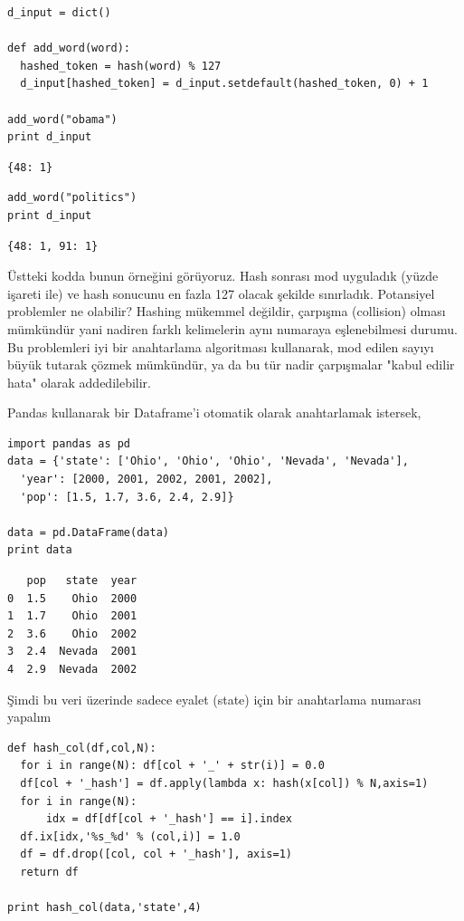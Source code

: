 \documentclass[12pt,fleqn]{article}\usepackage{../../common}
\begin{document}
\begin{verbatim}
d_input = dict()

def add_word(word):
  hashed_token = hash(word) % 127
  d_input[hashed_token] = d_input.setdefault(hashed_token, 0) + 1

add_word("obama")
print d_input
\end{verbatim}

\begin{verbatim}
{48: 1}
\end{verbatim}

\begin{verbatim}
add_word("politics")
print d_input
\end{verbatim}

\begin{verbatim}
{48: 1, 91: 1}
\end{verbatim}

Üstteki kodda bunun örneğini görüyoruz. Hash sonrası mod uyguladık (yüzde
işareti ile) ve hash sonucunu en fazla 127 olacak şekilde sınırladık.
Potansiyel problemler ne olabilir? Hashing mükemmel değildir, çarpışma
(collision) olması mümkündür yani nadiren farklı kelimelerin aynı numaraya
eşlenebilmesi durumu. Bu problemleri iyi bir anahtarlama algoritması
kullanarak, mod edilen sayıyı büyük tutarak çözmek mümkündür, ya da bu tür
nadir çarpışmalar "kabul edilir hata" olarak addedilebilir.

Pandas kullanarak bir Dataframe'i otomatik olarak anahtarlamak istersek,

\begin{verbatim}
import pandas as pd
data = {'state': ['Ohio', 'Ohio', 'Ohio', 'Nevada', 'Nevada'],
  'year': [2000, 2001, 2002, 2001, 2002],
  'pop': [1.5, 1.7, 3.6, 2.4, 2.9]}

data = pd.DataFrame(data)
print data
\end{verbatim}

\begin{verbatim}
   pop   state  year
0  1.5    Ohio  2000
1  1.7    Ohio  2001
2  3.6    Ohio  2002
3  2.4  Nevada  2001
4  2.9  Nevada  2002
\end{verbatim}

Şimdi bu veri üzerinde sadece eyalet (state) için bir anahtarlama numarası
yapalım

\begin{verbatim}
def hash_col(df,col,N):
  for i in range(N): df[col + '_' + str(i)] = 0.0
  df[col + '_hash'] = df.apply(lambda x: hash(x[col]) % N,axis=1)    
  for i in range(N):
      idx = df[df[col + '_hash'] == i].index
  df.ix[idx,'%s_%d' % (col,i)] = 1.0
  df = df.drop([col, col + '_hash'], axis=1)
  return df

print hash_col(data,'state',4)
\end{verbatim}
\end{document}
